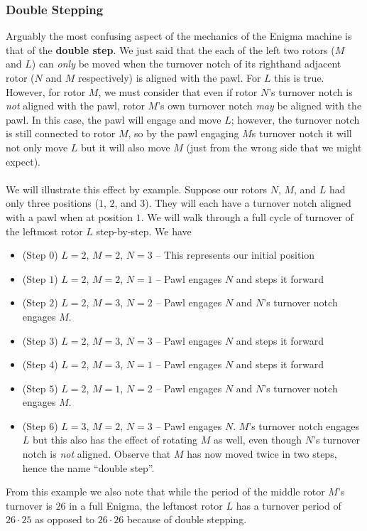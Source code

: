 \subsubsection{Double Stepping}\label{double_step}
Arguably the most confusing aspect of the mechanics of the Enigma
machine is that of the {\bf{double step}}. We just said that the each
of the left two rotors ($M$ and $L$) can \emph{only} be moved when
the turnover notch of its righthand adjacent rotor ($N$ and $M$
respectively) is aligned with the pawl. For $L$ this is true.
However, for rotor $M$, we must consider that even if rotor $N$'s
turnover notch is \emph{not} aligned with the pawl, rotor $M$'s own
turnover notch \emph{may} be aligned with the pawl. In this case, the
pawl will engage and move $L$; however, the turnover notch is still
connected to rotor $M$, so by the pawl engaging $M$s turnover notch
it will not only move $L$ but it will also move $M$ (just from the
wrong side that we might expect).
\\\\We will illustrate this effect by example. Suppose our rotors
$N$, $M$, and $L$ had only three positions ($1$, $2$, and $3$). They
will each have a turnover notch aligned with a pawl when at position
$1$. We will walk through a full cycle of turnover of the leftmost
rotor $L$ step-by-step. We have
\begin{itemize}
  \item (Step $0$) $L = 2$, $M = 2$, $N = 3$ -- This represents our
    initial position
  \item (Step $1$) $L = 2$, $M = 2$, $N = 1$ -- Pawl engages $N$ and
    steps it forward
  \item (Step $2$) $L = 2$, $M = 3$, $N = 2$ -- Pawl engages $N$ and
    $N$'s turnover notch engages $M$.
  \item (Step $3$) $L = 2$, $M = 3$, $N = 3$ -- Pawl engages $N$ and
    steps it forward
  \item (Step $4$) $L = 2$, $M = 3$, $N = 1$ -- Pawl engages $N$ and
    steps it forward
  \item (Step $5$) $L = 2$, $M = 1$, $N = 2$ -- Pawl engages $N$ and
    $N$'s turnover notch engages $M$.
  \item (Step $6$) $L = 3$, $M = 2$, $N = 3$ -- Pawl engages $N$.
    $M$'s turnover notch engages $L$ but this also has the effect of
    rotating $M$ as well, even though $N$'s turnover notch is
    \emph{not} aligned. Observe that $M$ has now moved twice in two
    steps, hence the name ``double step''.
\end{itemize}
From this example we also note that while the period of the middle
rotor $M$'s turnover is $26$ in a full Enigma, the leftmost rotor $L$
has a turnover period of $26\cdot25$ as opposed to $26\cdot26$
because of double stepping.
